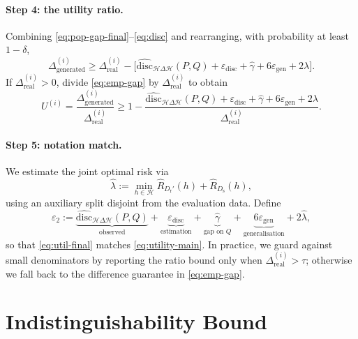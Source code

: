 \paragraph{Step 4: the utility ratio.}
Combining \eqref{eq:pop-gap-final}--\eqref{eq:disc} and rearranging, with probability at least $1-\delta$,
\begin{equation}
\Delta_{\text{generated}}^{(i)}
\ge \Delta_{\text{real}}^{(i)}
-\Big[\widehat{\mathrm{disc}}_{\mathcal H\Delta\mathcal H}(P,Q)
+\varepsilon_{\mathrm{disc}}
+\hat\gamma
+6\varepsilon_{\mathrm{gen}}
+2\lambda\Big].
\tag{A.10}\label{eq:emp-gap}
\end{equation}
If $\Delta_{\text{real}}^{(i)}>0$, divide \eqref{eq:emp-gap} by $\Delta_{\text{real}}^{(i)}$ to obtain
\begin{equation}
U^{(i)}
=\frac{\Delta_{\text{generated}}^{(i)}}{\Delta_{\text{real}}^{(i)}}
\ge
1-\frac{\widehat{\mathrm{disc}}_{\mathcal H\Delta\mathcal H}(P,Q)+\varepsilon_{\mathrm{disc}}+\hat\gamma+6\varepsilon_{\mathrm{gen}}+2\lambda}{\Delta_{\text{real}}^{(i)}}.
\tag{A.11}\label{eq:util-final}
\end{equation}

\paragraph{Step 5: notation match.}
We estimate the joint optimal risk via
\begin{equation}
\widehat\lambda := \min_{h\in\mathcal H}\widehat R_{D_{\mathrm r}'}(h)+\widehat R_{D_{\mathrm s}}(h),
\end{equation}
using an auxiliary split disjoint from the evaluation data. Define
\begin{equation}
\varepsilon_2 :=
\underbrace{\widehat{\mathrm{disc}}_{\mathcal H\Delta\mathcal H}(P,Q)}_{\text{observed}}
+\underbrace{\varepsilon_{\mathrm{disc}}}_{\text{estimation}}
+\underbrace{\hat\gamma}_{\text{gap on }Q}
+\underbrace{6\varepsilon_{\mathrm{gen}}}_{\text{generalisation}}
+2\widehat\lambda,
\tag{A.12}\label{eq:eps2}
\end{equation}
so that \eqref{eq:util-final} matches \eqref{eq:utility-main}. In practice, we guard against small denominators by reporting the ratio bound only when $\Delta_{\text{real}}^{(i)}>\tau$; otherwise we fall back to the difference guarantee in \eqref{eq:emp-gap}.

\section{Indistinguishability Bound}
\label{app:theory-indistinguishability}

